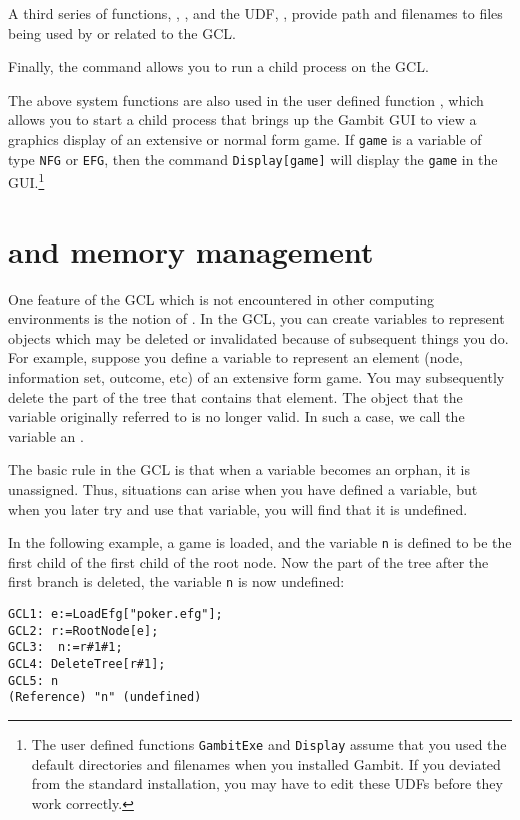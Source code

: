 A third series of functions, , , and the
UDF, , provide path and filenames to files being used
by or related to the GCL.

Finally, the  command allows you to run a child process on
the GCL.  

The above system functions are also used in the user defined function
, which allows you to start a child process that brings
up the Gambit GUI to view a graphics display of an extensive or normal
form game. If \verb+game+ is a variable of type \verb+NFG+ or
\verb+EFG+, then the command \verb+Display[game]+ will display the
\verb+game+ in the GUI.\footnote{The user defined functions
\verb+GambitExe+ and \verb+Display+ assume that you used the default
directories and filenames when you installed Gambit.  If you deviated
from the standard installation, you may have to edit these UDFs
before they work correctly.}

\section{ and memory management}

One feature of the GCL which is not encountered in other computing
environments is the notion of .  In the GCL, you
can create variables to represent objects which may be deleted or
invalidated because of subsequent things you do. For example, suppose
you define a variable to represent an element (node, information set,
outcome, etc) of an extensive form game.  You may subsequently delete
the part of the tree that contains that element.  The object that the
variable originally referred to is no longer valid.  In such a case,
we call the variable an .

The basic rule in the GCL is that when a variable becomes an orphan,
it is unassigned.  Thus, situations can arise when you have defined a
variable, but when you later try and use that variable, you will find
that it is undefined.  

In the following example, a game is loaded, and the variable \verb+n+
is defined to be the first child of the first child of the root node.
Now the part of the tree after the first branch is deleted, the
variable \verb+n+ is now undefined:

\begin{verbatim}
GCL1: e:=LoadEfg["poker.efg"];
GCL2: r:=RootNode[e];
GCL3:  n:=r#1#1;
GCL4: DeleteTree[r#1];
GCL5: n
(Reference) "n" (undefined)
\end{verbatim}

